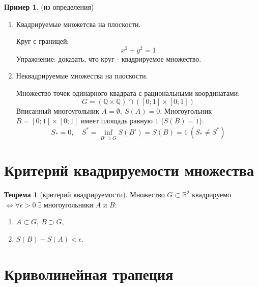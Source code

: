 \documentclass{report}
\theoremstyle{definition}
\newtheorem*{example}{Пример}
\newtheorem*{theorem}{Теорема}
\begin{document}
\begin{example}
    (из определения)

    \begin{enumerate}
        \item Квадрируемые множетсва на плоскости.

              Круг с границей:
              \begin{equation*}
                  x^2 + y^2 = 1
              \end{equation*}
              Упражнение: доказать, что круг - квадрируемое множество.
        \item Неквадрируемые множества на плоскости.

              Множество точек одинарного квадрата с рациональными координатами:
              \begin{equation*}
                  G = (\mathbb{Q} \times \mathbb{Q})\cap([0;1] \times [0;1])
              \end{equation*}
              Вписанный многоугольник $A = \emptyset, \ S(A) = 0$. Многоугольник $B = [0;1] \times [0;1]$
              имеет площадь равную  $1$ ($S(B) = 1$).
              \begin{equation*}
                  S_* = 0, \quad S^* = \underset{B'\supset G}{\inf}S(B') = S(B) = 1 \ (S_* \ne S^*)
              \end{equation*}
    \end{enumerate}
\end{example}

\section{Критерий квадрируемости множества}

\begin{theorem}[критерий квадрируемости]
    Множество $G\subset\mathbb{R}^2$ квадрируемо $\iff \forall \epsilon > 0 \ \exists$ многоугольники $A$ и $B$:
    \begin{enumerate}
        \item $A\subset G, \ B \supset G$,
        \item $S(B) - S(A) < \epsilon$.
    \end{enumerate}
\end{theorem}

\section{Криволинейная трапеция}
\end{document}
